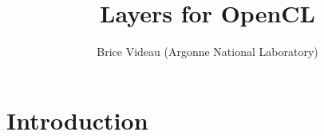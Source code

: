 \documentclass{beamer}
\title{Layers for OpenCL}
\author{Brice Videau (Argonne National Laboratory)}
\begin{document}
\frame{\titlepage}

\section{Introduction}

\end{document}
